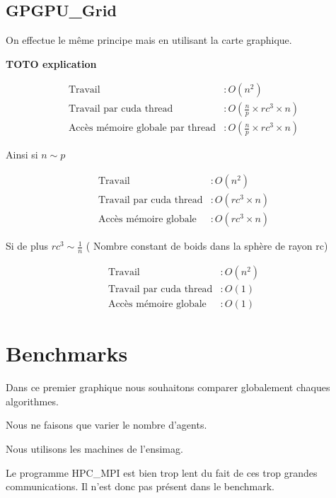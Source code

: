 \documentclass[liens,entete-ensimag,margeCorrection]{ensirapport}
\begin{document}
\subsection{GPGPU\_Grid}
On effectue le même principe mais en utilisant la carte graphique.

\textbf{TOTO explication}

\begin{align*}
    \text{Travail} &: O\left( n^2 \right) \\
    \text{Travail par cuda thread} &: O\left( \frac n p \times rc^3 \times n \right)  \\
    \text{Accès mémoire globale par thread} &: O\left( \frac n p \times rc^3 \times n \right)
\end{align*}

Ainsi si $n \sim p$

\begin{align*}
    \text{Travail} &: O\left( n^2 \right) \\
    \text{Travail par cuda thread} &: O\left( rc^3 \times n \right)  \\
    \text{Accès mémoire globale} &: O\left( rc^3 \times n \right)
\end{align*}

Si de plus  $ rc^3 \sim \frac 1n$  ( Nombre constant de boids dans la sphère de rayon rc)

\begin{align*}
    \text{Travail} &: O\left( n^2 \right) \\
    \text{Travail par cuda thread} &: O\left( 1 \right)  \\
    \text{Accès mémoire globale} &: O\left( 1\right)
\end{align*}

\section{Benchmarks}

Dans ce premier graphique nous souhaitons comparer globalement chaques algorithmes.

Nous ne faisons que varier le nombre d'agents.

Nous utilisons les machines de l'ensimag.

Le programme HPC\_MPI est bien trop lent du fait de ces trop grandes communications.
Il n'est donc pas présent dans le benchmark.
\end{document}
